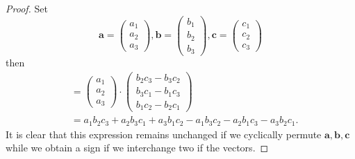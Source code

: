 \begin{proof}
    Set
    \[
        \bm a=
        \begin{pmatrix}
            a_1\\a_2\\a_3
        \end{pmatrix}
        ,\bm b=
        \begin{pmatrix}
            b_1\\b_2\\b_3
        \end{pmatrix}
        ,\bm c=
        \begin{pmatrix}
            c_1\\c_2\\c_3
        \end{pmatrix}
    \]
    then
    \begin{align*}
        [\bm a,\bm b,\bm c]&=
        \begin{pmatrix}
            a_1\\a_2\\a_3
        \end{pmatrix}
        \cdot
        \begin{pmatrix}
            b_2c_3-b_3c_2\\
            b_3c_1-b_1c_3\\
            b_1c_2-b_2c_1
        \end{pmatrix}
        \\
        &=a_1b_2c_3+a_2b_3c_1+a_3b_1c_2-a_1b_3c_2-a_2b_1c_3-a_3b_2c_1.
    \end{align*}
    It is clear that this expression remains unchanged if we cyclically permute $\bm a,\bm b,\bm c$ while we obtain a sign if we interchange two if the vectors.
\end{proof}

